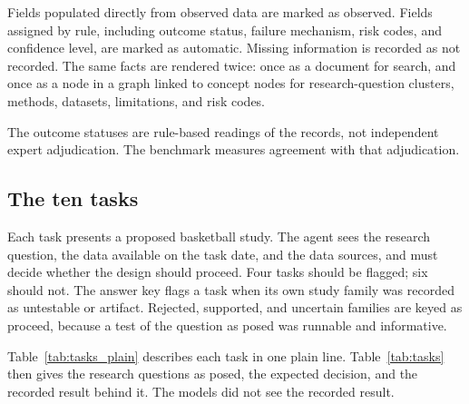 \documentclass[11pt]{article}
\begin{document}
Fields populated directly from observed data are marked as observed. Fields assigned by rule, including outcome status, failure mechanism, risk codes, and confidence level, are marked as automatic. Missing information is recorded as not recorded. The same facts are rendered twice: once as a document for search, and once as a node in a graph linked to concept nodes for research-question clusters, methods, datasets, limitations, and risk codes.

The outcome statuses are rule-based readings of the records, not independent expert adjudication. The benchmark measures agreement with that adjudication.

\subsection{The ten tasks}

Each task presents a proposed basketball study. The agent sees the research question, the data available on the task date, and the data sources, and must decide whether the design should proceed. Four tasks should be flagged; six should not. The answer key flags a task when its own study family was recorded as untestable or artifact. Rejected, supported, and uncertain families are keyed as proceed, because a test of the question as posed was runnable and informative.

Table~\ref{tab:tasks_plain} describes each task in one plain line. Table~\ref{tab:tasks} then gives the research questions as posed, the expected decision, and the recorded result behind it. The models did not see the recorded result.
\end{document}
